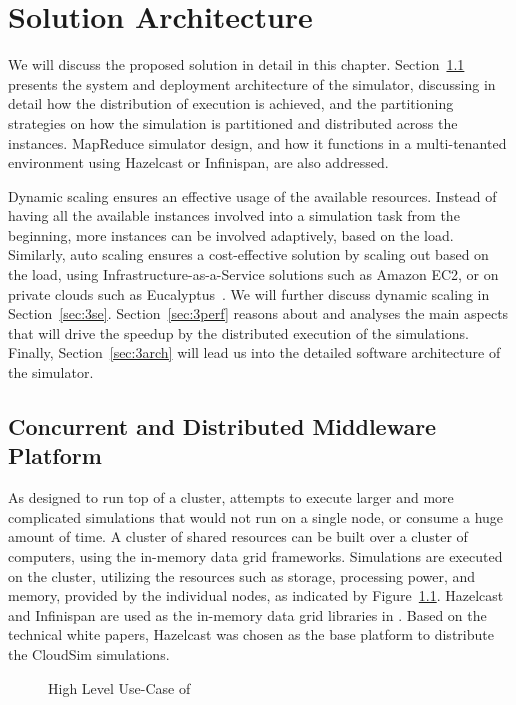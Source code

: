 \chapter{Solution Architecture}
\label{chap:sa}
We will discuss the proposed solution in detail in this chapter. Section~\ref{sec:3con} presents the system and deployment architecture of the simulator, discussing in detail how the distribution of execution is achieved, and the partitioning strategies on how the simulation is partitioned and distributed across the instances. MapReduce simulator design, and how it functions in a multi-tenanted environment using Hazelcast or Infinispan, are also addressed. 

Dynamic scaling ensures an effective usage of the available resources. Instead of having all the available instances involved into a simulation task from the beginning, more instances can be involved adaptively, based on the load. Similarly, auto scaling ensures a cost-effective solution by scaling out based on the load, using Infrastructure-as-a-Service solutions such as Amazon EC2, or on private clouds such as Eucalyptus~\cite{nurmi2009eucalyptus}. We will further discuss dynamic scaling in Section~\ref{sec:3se}. Section~\ref{sec:3perf} reasons about and analyses the main aspects that will drive the speedup by the distributed execution of the simulations. Finally, Section~\ref{sec:3arch} will lead us into the detailed software architecture of the simulator.


\section{Concurrent and Distributed Middleware Platform}
\label{sec:3con}
As designed to run top of a cluster,  attempts to execute larger and more complicated simulations that would not run on a single node, or consume a huge amount of time. A cluster of shared resources can be built over a cluster of computers, using the in-memory data grid frameworks. Simulations are executed on the cluster, utilizing the resources such as storage, processing power, and memory, provided by the individual nodes, as indicated by Figure~\ref{fig:datagrid}. Hazelcast and Infinispan are used as the in-memory data grid libraries in . Based on the technical white papers, Hazelcast was chosen as the base platform to distribute the CloudSim simulations.

\begin{figure}[!htbp]
\begin{center}
\end{center}

 \caption{High Level Use-Case of }
 \label{fig:datagrid}
\end{figure}

